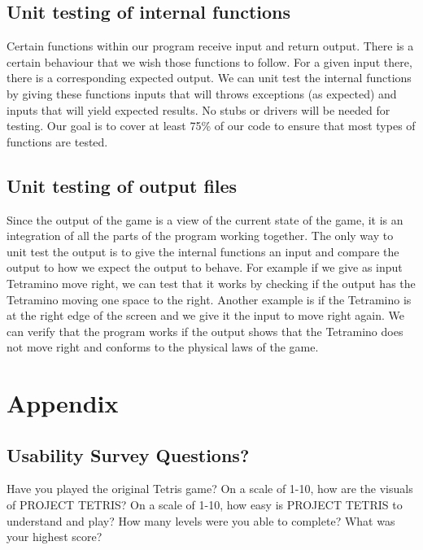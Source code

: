\documentclass[12pt, titlepage]{article}
\begin{document}
\subsection{Unit testing of internal functions}
Certain functions within our program receive input and return output. There is a certain behaviour that we wish those functions to follow. For a given input there, there is a corresponding expected output. We can unit test the internal functions by giving these functions inputs that will throws exceptions (as expected) and inputs that will yield expected results. No stubs or drivers will be needed for testing. Our goal is to cover at least 75\%  of our code to ensure that most types of functions are tested.        		
\subsection{Unit testing of output files}	
Since the output of the game is a view of the current state of the game, it is an integration of all the parts of the program working together. The only way to unit test the output is to give the internal functions an input and compare the output to how we expect the output to behave. For example if we give as input Tetramino move right, we can test that it works by checking if the output has the Tetramino moving one space to the right. Another example is if the Tetramino is at the right edge of the screen and we give it the input to move right again. We can verify that the program works if the output shows that the Tetramino does not move right and conforms to the physical laws of the game.       	


\newpage
\section{Appendix}
\subsection{Usability Survey Questions?}
Have you played the original Tetris game?
On a scale of 1-10, how are the visuals of PROJECT TETRIS?
On a scale of 1-10, how easy is PROJECT TETRIS to understand and play?
How many levels were you able to complete?
What was your highest score?
\end{document}
